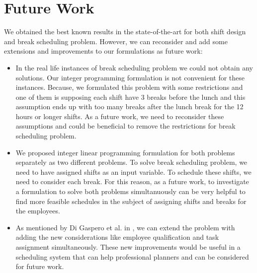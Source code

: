 \section{Future Work}

We obtained the best known results in the state-of-the-art for both shift design and break scheduling problem. However, we can reconsider and add some extensions and improvements to our formulations as future work:

\begin{itemize}


\item In the real life instances of break scheduling problem we could not obtain any solutions. Our integer programming formulation is not convenient for these instances. Because, we formulated this problem with some restrictions and one of them is supposing each shift have 3 breaks before the lunch and this assumption ends up with too many breaks after the lunch break for the 12 hours or longer shifts. As a future work, we need to reconsider these assumptions and could be beneficial to remove the restrictions for break scheduling problem.

\item We proposed integer linear programming formulation for both problems separately as two different problems. To solve break scheduling problem, we need to have assigned shifts as an input variable. To schedule these shifts, we need to consider each break. For this reason, as a future work, to investigate a formulation to solve both problems simultanuously can be very helpful to find more feasible schedules in the subject of assigning shifts and breaks for the employees. 

\item As mentioned by Di Gaspero et al. in \cite{li:2013:gaspero}, we can extend the problem with adding the new considerations like employee qualification and task assignment simultaneously. These new improvements would be useful in a scheduling system that can help professional planners and can be considered for future work.

\end{itemize}